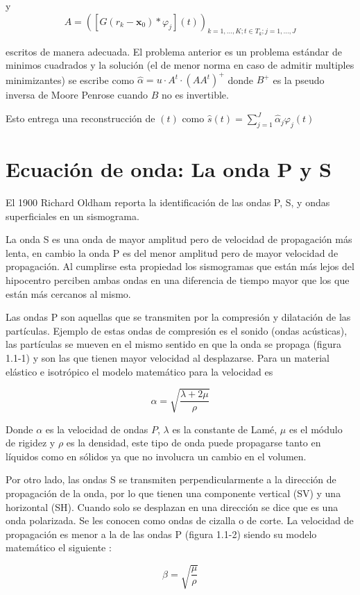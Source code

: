 y
$$A=\left(\left[G\left(r_{k}-\mathbf{x}_{0}\right)\ast\varphi_{j}\right]\left(t\right)\right)_{k=1,\ldots,K;t\in
T_{k};j=1,\ldots,J}$$
 

escritos de manera adecuada. El problema anterior es un problema estándar de
minimos cuadrados  y la solución (el de menor norma en caso de admitir multiples
minimizantes)  se escribe como $\hat{\alpha}=u\cdot
A^{t}\cdot\left(AA^{t}\right)^{+}$ donde $B^{+}$ es la pseudo inversa de Moore
Penrose cuando $B$ no es invertible.

Esto entrega una reconstrucción de $\left(t\right)$ como
$\hat{s}\left(t\right)=\sum_{j=1}^{J}\hat{\alpha}_{j}\varphi_{j}\left(t\right)$


\section{Ecuación de onda: La onda P y S}

El 1900 Richard Oldham reporta la identificación de las ondas P, S, y ondas
superficiales en un sismograma. 

La onda S es una onda de mayor amplitud pero de velocidad de propagación más
lenta, en cambio la onda P es del menor amplitud pero de mayor velocidad de
propagación. Al cumplirse esta propiedad los sismogramas que están más lejos del
hipocentro perciben ambas ondas en una diferencia de tiempo mayor que los que
están más cercanos al mismo.

Las ondas P son aquellas que se transmiten por la compresión y dilatación de las
partículas. Ejemplo de estas ondas de compresión es el sonido (ondas acústicas),
las partículas se mueven en el mismo sentido en que la onda se propaga (figura
1.1-1) y son las que tienen mayor velocidad al desplazarse. Para un material
elástico e isotrópico el modelo matemático para la velocidad es \cite{stein2009introduction}

$$\alpha = \sqrt{\frac{\lambda + 2\mu}{\rho}}$$

Donde $\alpha$ es la velocidad de ondas $P$, $\lambda$ es la constante de Lamé,
$\mu$ es el módulo de rigidez y $\rho$ es la densidad, este tipo de onda puede
propagarse tanto en líquidos como en sólidos ya que no involucra un cambio en el volumen.

Por otro lado, las ondas S se transmiten perpendicularmente a la dirección de
propagación de la onda, por lo que tienen una componente vertical (SV) y una
horizontal (SH). Cuando solo se desplazan en una dirección se dice que es una
onda polarizada. Se les conocen como ondas de cizalla o de corte. La velocidad
de propagación es menor a la de las ondas P (figura 1.1-2) siendo su modelo
matemático el siguiente \cite{stein2009introduction}:

$$\beta = \sqrt{\frac{\mu}{\rho}}$$





